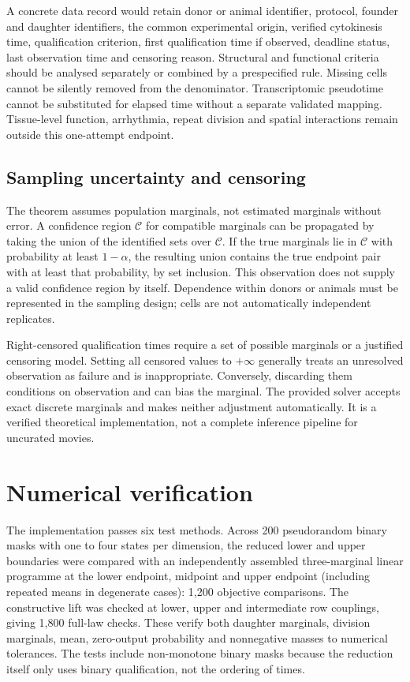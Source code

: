 \documentclass[11pt]{article}
\begin{document}
A concrete data record would retain donor or animal identifier, protocol, founder and daughter identifiers, the common experimental origin, verified cytokinesis time, qualification criterion, first qualification time if observed, deadline status, last observation time and censoring reason. Structural and functional criteria should be analysed separately or combined by a prespecified rule. Missing cells cannot be silently removed from the denominator. Transcriptomic pseudotime cannot be substituted for elapsed time without a separate validated mapping. Tissue-level function, arrhythmia, repeat division and spatial interactions remain outside this one-attempt endpoint.

\subsection{Sampling uncertainty and censoring}
The theorem assumes population marginals, not estimated marginals without error. A confidence region $\mathcal C$ for compatible marginals can be propagated by taking the union of the identified sets over $\mathcal C$. If the true marginals lie in $\mathcal C$ with probability at least $1-\alpha$, the resulting union contains the true endpoint pair with at least that probability, by set inclusion. This observation does not supply a valid confidence region by itself. Dependence within donors or animals must be represented in the sampling design; cells are not automatically independent replicates.

Right-censored qualification times require a set of possible marginals or a justified censoring model. Setting all censored values to $+\infty$ generally treats an unresolved observation as failure and is inappropriate. Conversely, discarding them conditions on observation and can bias the marginal. The provided solver accepts exact discrete marginals and makes neither adjustment automatically. It is a verified theoretical implementation, not a complete inference pipeline for uncurated movies.

\section{Numerical verification}
The implementation passes six test methods. Across 200 pseudorandom binary masks with one to four states per dimension, the reduced lower and upper boundaries were compared with an independently assembled three-marginal linear programme at the lower endpoint, midpoint and upper endpoint (including repeated means in degenerate cases): 1,200 objective comparisons. The constructive lift was checked at lower, upper and intermediate row couplings, giving 1,800 full-law checks. These verify both daughter marginals, division marginals, mean, zero-output probability and nonnegative masses to numerical tolerances. The tests include non-monotone binary masks because the reduction itself only uses binary qualification, not the ordering of times.
\end{document}
